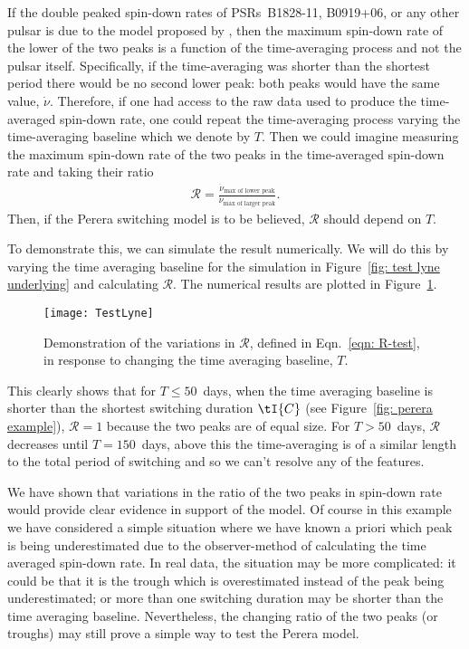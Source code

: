 If the double peaked spin-down rates of PSRs~B1828-11, B0919+06, or any other pulsar
is due to the model proposed by \citet{Perera2015}, then the maximum spin-down rate
of the lower of the two peaks is a function of the time-averaging process and not
the pulsar itself.  Specifically, if the time-averaging was shorter than the
shortest period there would be no second lower peak: both peaks would have the same
value, $\dot{\nu}$.  Therefore, if one had access to the raw data used to
produce the time-averaged spin-down rate, one could repeat the time-averaging
process varying the time-averaging baseline which we denote by $T$. Then we
could imagine measuring the maximum spin-down rate of the two peaks in the
time-averaged spin-down rate and taking their ratio
\begin{align}
\mathcal{R} = \frac{\dot{\nu}_\textrm{max of lower peak}}
                   {\dot{\nu}_\textrm{max of larger peak}}.
\label{eqn: R-test}
\end{align}
Then, if the Perera switching model is to be believed, $\mathcal{R}$ should depend on $T$.

To demonstrate this, we can simulate the result numerically. We will do this by
varying the time averaging baseline for the simulation in Figure~\ref{fig: test
lyne underlying} and calculating $\mathcal{R}$. The numerical results are
plotted in Figure~\ref{fig: test lyne}.
\begin{figure}[htb]
    \centering
    \texttt{[image: TestLyne]}
    \caption{Demonstration of the variations in $\mathcal{R}$, defined in
             Eqn.~\eqref{eqn: R-test}, in response to changing the time averaging
             baseline, $T$.}
    \label{fig: test lyne}
\end{figure}
This clearly shows that for $T\le50$~days, when the time averaging baseline is
shorter than the shortest switching duration $\tI{C}$ (see Figure~\ref{fig:
perera example}), $\mathcal{R}=1$ because the two peaks are of equal size.  For
$T>50$~days, $\mathcal{R}$ decreases until $T=150$~days, above this the
time-averaging is of a similar length to the total period of switching and so
we can't resolve any of the features.

We have shown that variations in the ratio of the two peaks in spin-down rate
would provide clear evidence in support of the \citet{Perera2015} model. Of
course in this example we have considered a simple situation where we have
known a priori which peak is being underestimated due to the observer-method of
calculating the time averaged spin-down rate. In real data, the situation may
be more complicated: it could be that it is the trough which is overestimated
instead of the peak being underestimated; or more than one switching duration
may be shorter than the time averaging baseline.  Nevertheless, the changing
ratio of the two peaks (or troughs) may still prove a simple way to test the
Perera model.

